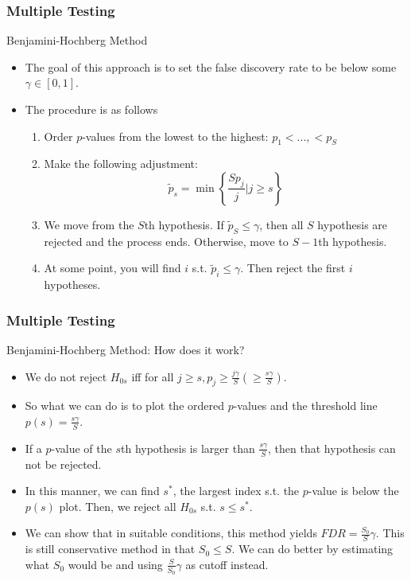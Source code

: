 \documentclass{beamer}
\begin{document}
\begin{frame}
\frametitle{Multiple Testing}
Benjamini-Hochberg Method
\begin{itemize}
\item The goal of this approach is to set the false discovery rate to be below some $\gamma\in[0,1]$.
\item The procedure is as follows
\begin{enumerate}
\item Order $p$-values from the lowest to the highest: $p_1<...,<p_S$
\item Make the following adjustment:
\[
\tilde{p}_s = \min\left\{\frac{Sp_j}{j}| j\geq s\right\}
\]
\item We move from the $S$th hypothesis. If $\tilde{p}_S\leq \gamma$, then all $S$ hypothesis are rejected and the process ends. Otherwise, move to $S-1$th hypothesis. 
\item At some point, you will find $i$ s.t. $\tilde{p}_i\leq \gamma$. Then reject the first $i$ hypotheses.
\end{enumerate}
\end{itemize}
\end{frame}

\begin{frame}
\frametitle{Multiple Testing}
Benjamini-Hochberg Method: How does it work?
\begin{itemize}
\item  We do not reject $H_{0s}$ iff for all $j\geq s, p_j\geq \frac{j\gamma}{S} \left(\geq\frac{s\gamma}{S}\right)$.
\item So what we can do is to plot the ordered $p$-values and the threshold line $p(s)=\frac{s\gamma}{S}$.
\item If a $p$-value of the $s$th hypothesis is larger than $\frac{s\gamma}{S}$, then that hypothesis can not be rejected.
\item In this manner, we can find $s^*$, the largest index s.t. the $p$-value is below the $p(s)$ plot. Then, we reject all $H_{0s}$ s.t. $s\leq s^*$. \par
\item We can show that in suitable conditions, this method yields $FDR=\frac{S_0}{S}\gamma$. This is still conservative method in that $S_0\leq S$. We can do better by estimating what $S_0$ would be and using $\frac{S}{S_0}\gamma$ as cutoff instead. 
\end{itemize}
\end{frame}
\end{document}
